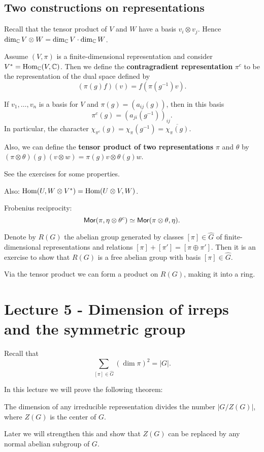 \documentclass[11pt, english]{article}
\begin{document}
\subsection{Two constructions on representations}

Recall that the tensor product of $V$ and $W$ have a basis $v_i \otimes v_j$. Hence $\dim_{\mathbb{C}} V \otimes W = \dim_{\mathbb{C}} V \cdot \dim_{\mathbb{C}} W$.

Assume $(V,\pi)$ is a finite-dimensional representation and consider $V^\ast = \operatorname{Hom}_{\mathbb{C}}(V,\mathbb{C})$. Then we define the \textbf{contragradient representation} $\pi^c$ to be the representation of the dual space defined by 
$$
(\pi(g)f)(v) = f(\pi(g^{-1})v).
$$

If $v_1,\ldots,v_n$ is a basis for $V$ and $\pi(g)=(a_{ij}(g))$, then in this basis 
$$
\pi^c(g) = (a_{ji}(g^{-1}))_{ij}.
$$
In particular, the character  $\chi_{\pi^c}(g)=\chi_\pi(g^{-1})=\overline{\chi_\pi(g)}$. 

Also, we can define the \textbf{tensor product of two representations} $\pi$ and $\theta$ by $(\pi \otimes \theta)(g)(v \otimes w) = \pi(g)v \otimes \theta(g)w$. 

See the exercises for some properties.

Also: $\operatorname{Hom}(U, W \otimes V^\ast)= \operatorname{Hom}(U \otimes V, W)$. 

Frobenius reciprocity:
$$
\mathsf{Mor}(\pi, \eta \otimes \theta^c) \simeq \mathsf{Mor}(\pi \otimes \theta, \eta).
$$

Denote by $R(G)$ the abelian group generated by classes $[\pi] \in \widehat G$ of finite-dimensional representations and relations $[\pi]+[\pi'] = [\pi \oplus \pi']$.  Then it is an exercise to show that $R(G)$ is a free abelian group with basis $[\pi] \in \widehat G$.

Via the tensor product we can form a product on $R(G)$, making it into a ring.


\section{Lecture 5 - Dimension of irreps and the symmetric group}

Recall that $$
\sum_{[\pi] \in \widehat G} (\dim \pi)^2 = \lvert G \rvert. $$

In this lecture we will prove the following theorem:

\begin{thm}
\label{thmzg}
 The dimension of any irreducible representation divides the number $\lvert G/Z(G) \rvert$, where $Z(G)$ is the center of $G$. 
\end{thm}
Later we will strengthen this and show that $Z(G)$ can be replaced by any normal abelian subgroup of $G$.
\end{document}
